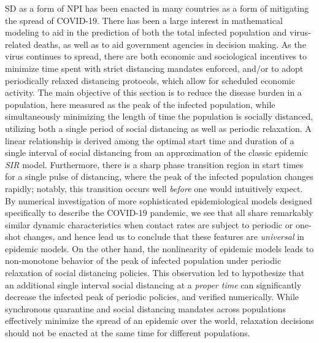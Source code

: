 \ac{SD} as a form of \ac{NPI} has been enacted in many countries as a form of mitigating the spread of COVID-19. 
There has been a large interest in mathematical modeling to aid in the prediction of both the total infected population and virus-related deaths, as well as to aid government agencies in decision making. As the virus continues to spread, there are both economic and sociological incentives to minimize time spent with strict distancing mandates enforced, and/or to adopt periodically relaxed distancing protocols, which allow for scheduled economic activity.
The main objective of this section is to reduce the disease burden in a population, here measured as the peak of the infected population, while simultaneously minimizing the length of time the population is socially distanced, utilizing both a single period of social distancing  as well as periodic relaxation.
A linear relationship is derived among the optimal start time and duration of a single interval of social distancing from an approximation of the classic epidemic \textit{SIR} model.
Furthermore, there is a sharp phase transition region in start times for a single pulse of distancing, where the peak of the infected population changes rapidly;  notably, this transition occurs well \emph{before} one would intuitively expect.
By numerical investigation of more sophisticated epidemiological models designed specifically to describe the COVID-19 pandemic, we see that all share remarkably similar dynamic characteristics when contact rates are subject to periodic or one-shot changes, and hence lead us to conclude that these features are \emph{universal} in epidemic models.
On the other hand, the nonlinearity of epidemic models leads to non-monotone behavior of the peak of infected population under periodic relaxation of social distancing policies.  
This observation led to hypothesize that an additional single interval social distancing at a \emph{proper time} can significantly decrease the infected peak of periodic policies, and verified numerically. 
While synchronous quarantine and social distancing mandates across populations effectively minimize the spread of an epidemic over the world, relaxation decisions should not be enacted at the same time for different populations.

